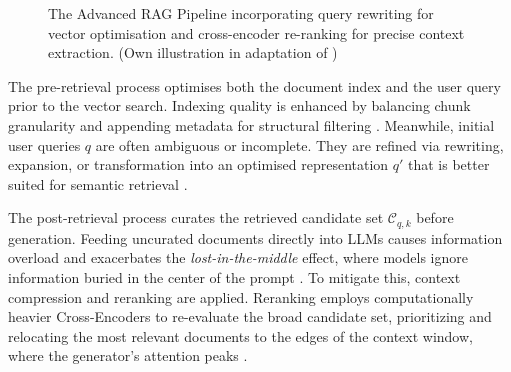 \begin{figure}[htbp]
{%
    }
    \caption[Architecture of an Advanced \acs{RAG} Pipeline.]{The Advanced \acs{RAG} Pipeline incorporating query rewriting for vector optimisation and cross-encoder re-ranking for precise context extraction. (Own illustration in adaptation of \cite{gao_2024_rag})}
    \label{fig:rag_advanced}
\end{figure}

The pre-retrieval process optimises both the document index and the user query prior to the vector search. Indexing quality is enhanced by balancing chunk granularity and appending metadata for structural filtering \cite{gao_2024_rag}. Meanwhile, initial user queries $q$ are often ambiguous or incomplete. They are refined via rewriting, expansion, or transformation into an optimised representation $q'$ that is better suited for semantic retrieval \cite{gao_2024_rag,Ma2023_QueryRewrite,peng_large_2024,zheng_take_2024}.

The post-retrieval process curates the retrieved candidate set $\mathcal{C}_{q,k}$ before generation. Feeding uncurated documents directly into \acp{LLM} causes information overload and exacerbates the \emph{lost-in-the-middle} effect, where models ignore information buried in the center of the prompt \cite{gao_2024_rag,Liu2023_LostInTheMiddle}. To mitigate this, context compression and reranking are applied. Reranking employs computationally heavier Cross-Encoders to re-evaluate the broad candidate set, prioritizing and relocating the most relevant documents to the edges of the context window, where the generator's attention peaks \cite{Nogueira2019_PassageReRanking}.

